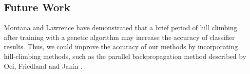 \documentclass[11pt]{article}       %
\begin{document}
\subsection{Future Work} \label{future}
Montana and Lawrence \cite{GA-ANN} have demonstrated that a brief period of hill climbing after training with a genetic algorithm may increase the accuracy of classifier results. Thus, we could improve the accuracy of our methods by incorporating hill-climbing methods, such as the parallel backpropagation method described by Oei, Friedland and Janin \cite{backprop}.




\end{document}
